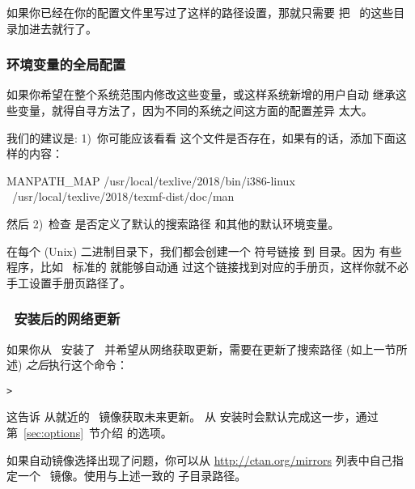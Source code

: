 \documentclass{article}
\begin{document}

如果你已经在你的配置文件里写过了这样的路径设置，那就只需要
把 \TL\ 的这些目录加进去就行了。

\subsubsection{环境变量的全局配置}
\label{sec:envglobal}

如果你希望在整个系统范围内修改这些变量，或这样系统新增的用户自动
继承这些变量，就得自寻方法了，因为不同的系统之间这方面的配置差异
太大。

我们的建议是: 1)~你可能应该看看 
这个文件是否存在，如果有的话，添加下面这样的内容：

\begin{sverbatim}
MANPATH_MAP /usr/local/texlive/2018/bin/i386-linux \
            /usr/local/texlive/2018/texmf-dist/doc/man
\end{sverbatim}

然后 2)~检查  是否定义了默认的搜索路径
和其他的默认环境变量。

在每个 (Unix) 二进制目录下，我们都会创建一个  符号链接
到  目录。因为
有些 \code{man} 程序，比如 \MacOSX\ 标准的  就能够自动通
过这个链接找到对应的手册页，这样你就不必手工设置手册页路径了。

\subsubsection{\DVD\ 安装后的网络更新}
\label{sec:dvd-install-net-updates}

如果你从 \DVD\ 安装了 \TL\ 并希望从网络获取更新，需要在更新了搜索路径
(如上一节所述) \emph{之后}执行这个命令：

\begin{alltt}
> 
\end{alltt}

这告诉  从就近的 \CTAN\ 镜像获取未来更新。
从 \DVD{} 安装时会默认完成这一步，通过第~\ref{sec:options}~节介绍
的选项。

如果自动镜像选择出现了问题，你可以从 \url{http://ctan.org/mirrors}
列表中自己指定一个 \CTAN\ 镜像。使用与上述一致的 
子目录路径。
\end{document}
